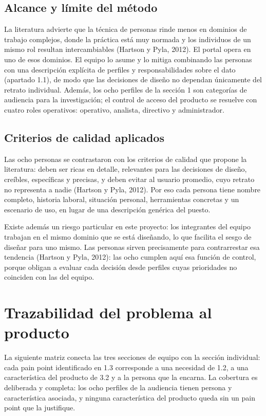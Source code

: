 \subsection{Alcance y límite del método}

La literatura advierte que la técnica de personas rinde menos en dominios de trabajo
complejos, donde la práctica está muy normada y los individuos de un mismo rol resultan
intercambiables (Hartson y Pyla, 2012). El portal opera en uno de esos dominios. El equipo lo
asume y lo mitiga combinando las personas con una descripción explícita de perfiles y
responsabilidades sobre el dato (apartado 1.1), de modo que las decisiones de diseño no
dependan únicamente del retrato individual. Además, los ocho perfiles de la sección 1 son
categorías de audiencia para la investigación; el control de acceso del producto se resuelve
con cuatro roles operativos: operativo, analista, directivo y administrador.

\subsection{Criterios de calidad aplicados}

Las ocho personas se contrastaron con los criterios de calidad que propone la literatura:
deben ser ricas en detalle, relevantes para las decisiones de diseño, creíbles, específicas y
precisas, y deben evitar al usuario promedio, cuyo retrato no representa a nadie (Hartson y
Pyla, 2012). Por eso cada persona tiene nombre completo, historia laboral, situación
personal, herramientas concretas y un escenario de uso, en lugar de una descripción genérica
del puesto.

Existe además un riesgo particular en este proyecto: los integrantes del equipo trabajan en el
mismo dominio que se está diseñando, lo que facilita el sesgo de diseñar para uno mismo. Las
personas sirven precisamente para contrarrestar esa tendencia (Hartson y Pyla, 2012): las
ocho cumplen aquí esa función de control, porque obligan a evaluar cada decisión desde
perfiles cuyas prioridades no coinciden con las del equipo.

\section{Trazabilidad del problema al producto}

La siguiente matriz conecta las tres secciones de equipo con la sección individual: cada pain
point identificado en 1.3 corresponde a una necesidad de 1.2, a una característica del
producto de 3.2 y a la persona que la encarna. La cobertura es deliberada y completa: los ocho
perfiles de la audiencia tienen persona y característica asociada, y ninguna característica
del producto queda sin un pain point que la justifique.


